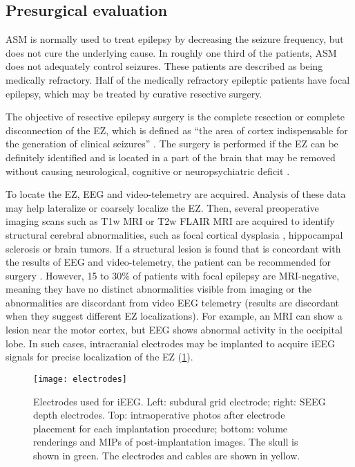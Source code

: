 \subsection{Presurgical evaluation}

\Ac{ASM} is normally used to treat epilepsy by decreasing the seizure frequency, but does not cure the underlying cause.
In roughly one third of the patients, \ac{ASM} does not adequately control seizures.
These patients are described as being medically refractory.
Half of the medically refractory epileptic patients have focal epilepsy, which may be treated by curative resective surgery.

The objective of resective epilepsy surgery is the complete resection or complete disconnection of the \ac{EZ}, which is defined as ``the area of cortex indispensable for the generation of clinical seizures'' \cite{rosenow_presurgical_2001}.
The surgery is performed if the \ac{EZ} can be definitely identified and is located in a part of the brain that may be removed without causing neurological, cognitive or neuropsychiatric deficit \cite{jobst_resective_2015}.

To locate the \ac{EZ}, \ac{EEG} and video-telemetry are acquired.
Analysis of these data may help lateralize or coarsely localize the \ac{EZ}.
Then, several preoperative imaging scans such as \ac{T1w} \ac{MRI} or \ac{T2w} \ac{FLAIR} \ac{MRI} are acquired to identify structural cerebral abnormalities, such as focal cortical dysplasia \cite{kabat_focal_2012}, hippocampal sclerosis \cite{thom_review_2014} or brain tumors.
If a structural lesion is found that is concordant with the results of \ac{EEG} and video-telemetry, the patient can be recommended for surgery \cite{duncan_brain_2016}.
However, 15 to 30\% of patients with focal epilepsy are \ac{MRI}-negative, meaning they have no distinct abnormalities visible from imaging or the abnormalities are discordant from video \ac{EEG} telemetry \cite{bien_characteristics_2009} (results are discordant when they suggest different \ac{EZ} localizations).
For example, an \ac{MRI} can show a lesion near the motor cortex, but \ac{EEG} shows abnormal activity in the occipital lobe.
In such cases, intracranial electrodes may be implanted to acquire \ac{iEEG} signals for precise localization of the \ac{EZ} (\cref{fig:electrodes}).

\begin{figure}[hbt!]
  \centering
  \texttt{[image: electrodes]}
  \caption[Electrodes used for intracranial EEG]{
    Electrodes used for \acf{iEEG}.
    Left: subdural grid electrode;
    right: \acf{SEEG} depth electrodes.
    Top: intraoperative photos after electrode placement for each implantation procedure;
    bottom: volume renderings and \acfp{MIP} of post-implantation images.
    The skull is shown in green.
    The electrodes and cables are shown in yellow.
  }\label{fig:electrodes}
\end{figure}

